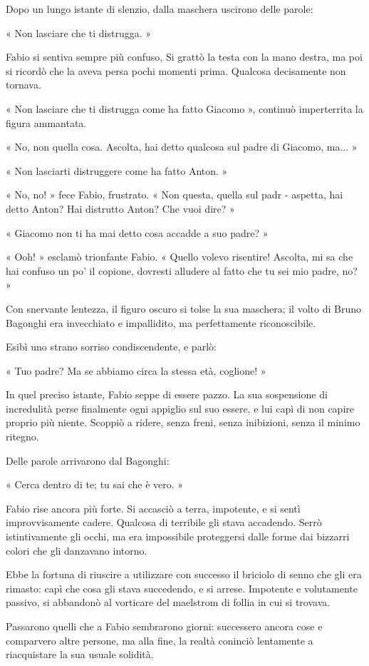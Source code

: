 Dopo un lungo istante di slenzio, dalla maschera uscirono delle parole:

« Non lasciare che ti distrugga. »

Fabio si sentiva sempre più confuso, Si grattò la testa con la mano destra, ma poi si ricordò che la aveva persa pochi momenti prima. Qualcosa decisamente non tornava.

« Non lasciare che ti distrugga come ha fatto Giacomo », continuò imperterrita la figura ammantata.

« No, non quella cosa. Ascolta, hai detto qualcosa sul padre di Giacomo, ma...  »

« Non lasciarti distruggere come ha fatto Anton. »

« No, no! » fece Fabio, frustrato. « Non questa, quella sul padr - aspetta, hai detto Anton? Hai distrutto Anton? Che vuoi dire? »

« Giacomo non ti ha mai detto cosa accadde a suo padre? »

« Ooh! » esclamò trionfante Fabio. « Quello volevo risentire! Ascolta, mi sa che hai confuso un po' il copione, dovresti alludere al fatto che tu sei mio padre, no? »

Con snervante lentezza, il figuro oscuro si tolse la sua maschera; il volto di Bruno Bagonghi era invecchiato e impallidito, ma perfettamente riconoscibile.

Esibì uno strano sorriso condiscendente, e parlò:

« Tuo padre? Ma se abbiamo circa la stessa età, coglione! »

In quel preciso istante, Fabio seppe di essere pazzo. La sua sospensione di incredulità perse finalmente ogni appiglio sul suo essere, e lui capì di non capire proprio più niente. Scoppiò a ridere, senza freni, senza inibizioni, senza il minimo ritegno.

Delle parole arrivarono dal Bagonghi:

« Cerca dentro di te; tu sai che è vero. »

Fabio rise ancora più forte. Si accasciò a terra, impotente, e si sentì improvvisamente cadere. Qualcosa di terribile gli stava accadendo. Serrò istintivamente gli occhi, ma era impossibile proteggersi dalle forme dai bizzarri colori che gli danzavano intorno.

Ebbe la fortuna di riuscire a utilizzare con successo il briciolo di senno che gli era rimasto: capì che cosa gli stava succedendo, e si arrese. Impotente e volutamente passivo, si abbandonò al vorticare del maelstrom di follia in cui si trovava.

Passarono quelli che a Fabio sembrarono giorni: successero ancora cose e comparvero altre persone, ma alla fine, la realtà coninciò lentamente a riacquistare la sua usuale solidità.
